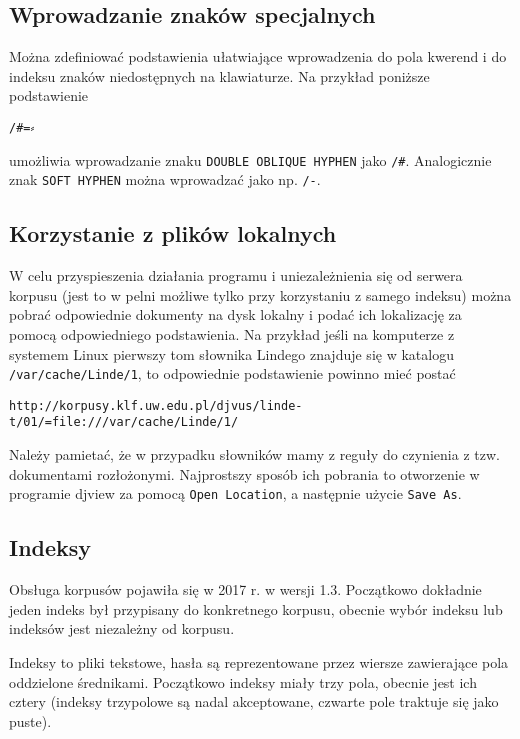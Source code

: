 \documentclass{mwart}
\begin{document}
\subsection{Wprowadzanie znaków specjalnych}
\label{sec:wprow-znak-specj}
Można zdefiniować podstawienia ułatwiające wprowadzenia do pola
kwerend i do indeksu znaków niedostępnych na klawiaturze. Na przykład
poniższe podstawienie
\begin{verbatim}
/#=⸗
\end{verbatim}
umożliwia wprowadzanie znaku \texttt{DOUBLE OBLIQUE HYPHEN} jako
\texttt{/\#}. Analogicznie znak \texttt{SOFT HYPHEN} można wprowadzać
jako np. \texttt{/-}.

\subsection{Korzystanie z plików lokalnych}
\label{sec:korzystanie-z-plikow}

W celu przyspieszenia działania programu i uniezależnienia się od
serwera korpusu (jest to w pelni możliwe tylko przy korzystaniu z
samego indeksu) można pobrać odpowiednie dokumenty na dysk lokalny i
podać ich lokalizację za pomocą odpowiedniego podstawienia. Na
przykład jeśli na komputerze z systemem Linux pierwszy tom słownika
Lindego znajduje się w katalogu \texttt{/var/cache/Linde/1}, to
odpowiednie podstawienie powinno mieć postać
\begin{verbatim}
http://korpusy.klf.uw.edu.pl/djvus/linde-t/01/=file:///var/cache/Linde/1/
\end{verbatim}

Należy pamietać, że w przypadku słowników mamy z reguły do czynienia z
tzw. dokumentami rozłożonymi. Najprostszy sposób ich pobrania to
otworzenie w programie \textsf{djview} za pomocą \texttt{Open
  Location}, a następnie użycie \texttt{Save As}.

\subsection{Indeksy}
\label{sec:indeksy} 

Obsługa korpusów pojawiła się w 2017 r. w wersji 1.3. Początkowo
dokładnie jeden indeks był przypisany do konkretnego korpusu, obecnie
wybór indeksu lub indeksów jest niezależny od korpusu.

Indeksy to pliki tekstowe, hasła są reprezentowane przez wiersze
zawierające pola oddzielone średnikami. Początkowo indeksy miały trzy
pola, obecnie jest ich cztery (indeksy trzypolowe są nadal
akceptowane, czwarte pole traktuje się jako puste).
\end{document}
